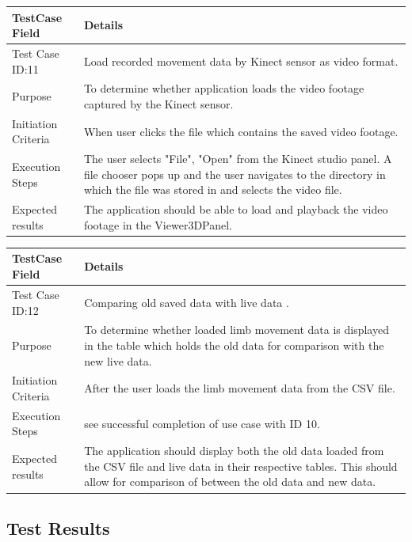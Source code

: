 \documentclass[a4paper, 12pt]{article}
\begin{document}
\begin{table}[!htb]
 \begin{tabular}{|p{4cm}|p{10cm}|}
 \hline
  TestCase Field & Details \\
  \hline
   Test Case ID:11 & Load recorded movement data by Kinect sensor as video format. \\
  \hline
   Purpose & To determine whether application loads the video footage captured by the Kinect sensor. \\
  \hline
   Initiation Criteria & When user clicks the file which contains the saved video footage. \\
  \hline
   Execution Steps & The user selects "File", "Open" from the Kinect studio panel. A file chooser pops up and the user navigates to the directory in which the file was stored in and selects the video file.  \\
  \hline
   Expected results & The application should be able to load and playback the video footage in the Viewer3DPanel. \\
  \hline
 \end{tabular}
\end{table}


\begin{table}[!htb]
 \begin{tabular}{|p{4cm}|p{10cm}|}
 \hline
  TestCase Field & Details \\
  \hline
   Test Case ID:12 & Comparing old saved data with live data . \\
  \hline 
   Purpose & To determine whether loaded limb movement data is displayed in the table which holds the old data for comparison with the new live data. \\
  \hline
   Initiation Criteria & After the user loads the limb movement data from the CSV file. \\
  \hline
   Execution Steps & see successful completion of use case with ID 10.  \\
  \hline
   Expected results & The application should display both the old data loaded from the CSV file and live data in their respective tables. This should allow for comparison of between the old data and new data. \\
  \hline
 \end{tabular}
\end{table}

\subsection{Test Results}
\clearpage
\newpage
\end{document}
